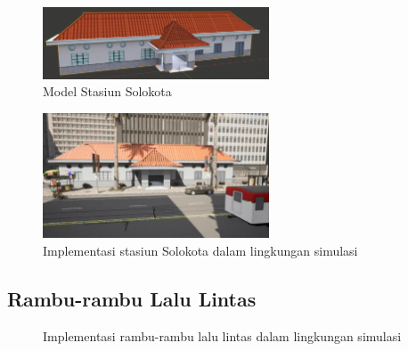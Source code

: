 \begin{figure}[ht]
    \centering
    \includegraphics[width=0.6\textwidth]{resources/chapter-3-stasiun-solokota-model.png}
    \caption{Model Stasiun Solokota}
    \label{fig:stasiun-solokota-model}
\end{figure}

\begin{figure}[ht]
    \centering
    \includegraphics[width=0.6\textwidth]{resources/chapter-4/stasiun-solokota-carla.png}
    \caption{Implementasi stasiun Solokota dalam lingkungan simulasi}
    \label{fig:stasiun-solokota}
\end{figure}

\subsection{Rambu-rambu Lalu Lintas}

\begin{figure}[ht]
	\centering
	\hfill
	\caption{Implementasi rambu-rambu lalu lintas dalam lingkungan simulasi}
	\label{fig:road-signs}
\end{figure}

